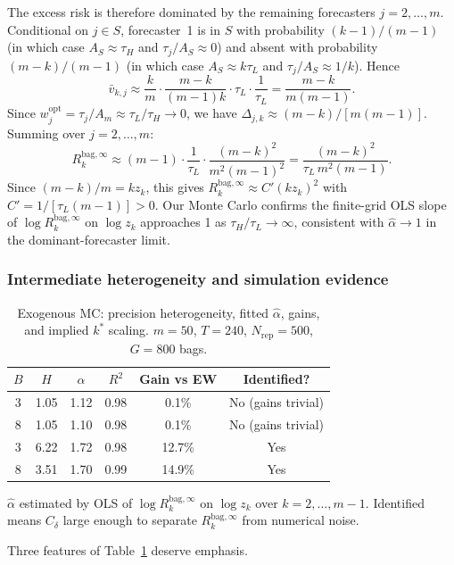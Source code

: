 \documentclass[12pt,a4paper]{article}
\theoremstyle{definition}
\newcommand{\Rk}{R_k^{\mathrm{bag},\infty}}
\begin{document}
The excess risk is therefore dominated by the remaining forecasters
$j=2,\ldots,m$.  Conditional on $j\in S$, forecaster~1 is in $S$ with
probability $(k-1)/(m-1)$ (in which case $A_S\approx\tau_H$ and
$\tau_j/A_S\approx 0$) and absent with probability $(m-k)/(m-1)$ (in
which case $A_S\approx k\tau_L$ and $\tau_j/A_S\approx 1/k$).  Hence
\[
  \bar v_{k,j} \approx \frac{k}{m}\cdot\frac{m-k}{(m-1)k}\cdot\tau_L\cdot\frac{1}{\tau_L}
  = \frac{m-k}{m(m-1)}.
\]
Since $w_j^{\mathrm{opt}}=\tau_j/A_m\approx\tau_L/\tau_H\to 0$, we have
$\Delta_{j,k}\approx(m-k)/[m(m-1)]$.  Summing over $j=2,\ldots,m$:
\begin{equation}\label{eq:Rk_dominant}
  \Rk \approx (m-1)\cdot\frac{1}{\tau_L}\cdot\frac{(m-k)^2}{m^2(m-1)^2}
  = \frac{(m-k)^2}{\tau_L\,m^2(m-1)}.
\end{equation}
Since $(m-k)/m=kz_k$, this gives $\Rk\approx C'(kz_k)^2$ with
$C'=1/[\tau_L(m-1)]>0$.  Our Monte Carlo confirms the finite-grid OLS
slope of $\log\Rk$ on $\log z_k$ approaches 1 as $\tau_H/\tau_L\to\infty$,
consistent with $\hat\alpha\to 1$ in the dominant-forecaster limit.

\subsubsection*{Intermediate heterogeneity and simulation evidence}

\begin{table}[ht]
\centering
\caption{Exogenous MC: precision heterogeneity, fitted $\hat\alpha$, gains,
  and implied $k^*$ scaling.
  $m=50$, $T=240$, $N_{\mathrm{rep}}=500$, $G=800$ bags.}
\label{tab:exo_alpha}
\begin{tabular}{cccccc}
\toprule
$B$ & $H$ & $\hat\alpha$ & $R^2$ & Gain vs EW & Identified? \\
\midrule
3 & 1.05 & 1.12 & 0.98 & 0.1\% & No (gains trivial) \\
8 & 1.05 & 1.10 & 0.98 & 0.1\% & No (gains trivial) \\
3 & 6.22 & 1.72 & 0.98 & 12.7\% & Yes \\
8 & 3.51 & 1.70 & 0.99 & 14.9\% & Yes \\
\bottomrule
\end{tabular}
\footnotesize{$\hat\alpha$ estimated by OLS of $\log\Rk$ on $\log z_k$ over $k=2,\ldots,m-1$.
Identified means $C_\delta$ large enough to separate $\Rk$ from numerical noise.}
\end{table}

Three features of Table~\ref{tab:exo_alpha} deserve emphasis.
\end{document}
